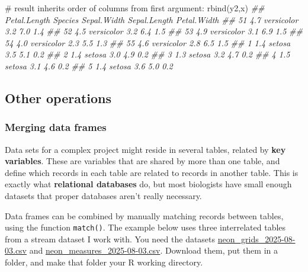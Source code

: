 \documentclass[
  13,
  letterpaper,
]{report}
\newenvironment{Shaded}{\begin{snugshade}}{\end{snugshade}}
\newcommand{\CommentTok}[1]{\textcolor[rgb]{0.37,0.37,0.37}{#1}}
\newcommand{\DocumentationTok}[1]{\textcolor[rgb]{0.37,0.37,0.37}{\textit{#1}}}
\newcommand{\FunctionTok}[1]{\textcolor[rgb]{0.28,0.35,0.67}{#1}}
\newcommand{\NormalTok}[1]{\textcolor[rgb]{0.00,0.23,0.31}{#1}}
\begin{document}
\begin{Shaded}
\begin{Highlighting}[]
\CommentTok{\# result inherits order of columns from first argument:}
\FunctionTok{rbind}\NormalTok{(y2,x)}
\DocumentationTok{\#\#    Petal.Length    Species Sepal.Width Sepal.Length Petal.Width}
\DocumentationTok{\#\# 51          4.7 versicolor         3.2          7.0         1.4}
\DocumentationTok{\#\# 52          4.5 versicolor         3.2          6.4         1.5}
\DocumentationTok{\#\# 53          4.9 versicolor         3.1          6.9         1.5}
\DocumentationTok{\#\# 54          4.0 versicolor         2.3          5.5         1.3}
\DocumentationTok{\#\# 55          4.6 versicolor         2.8          6.5         1.5}
\DocumentationTok{\#\# 1           1.4     setosa         3.5          5.1         0.2}
\DocumentationTok{\#\# 2           1.4     setosa         3.0          4.9         0.2}
\DocumentationTok{\#\# 3           1.3     setosa         3.2          4.7         0.2}
\DocumentationTok{\#\# 4           1.5     setosa         3.1          4.6         0.2}
\DocumentationTok{\#\# 5           1.4     setosa         3.6          5.0         0.2}
\end{Highlighting}
\end{Shaded}

\subsection{Other operations}\label{sec-05-df-oth}

\subsubsection{Merging data frames}\label{sec-05-df-oth-merg}

Data sets for a complex project might reside in several tables, related
by \textbf{key variables}. These are variables that are shared by more
than one table, and define which records in each table are related to
records in another table. This is exactly what \textbf{relational
databases} do, but most biologists have small enough datasets that
proper databases aren't really necessary.

Data frames can be combined by manually matching records between tables,
using the function \texttt{match()}. The example below uses three
interrelated tables from a stream dataset I work with. You need the
datasets
\href{https://greenquanteco.github.io/neon_grids_2025-08-03.csv}{neon\_grids\_2025-08-03.csv}
and
\href{https://greenquanteco.github.io/neon_measures_2025-08-03.csv}{neon\_measures\_2025-08-03.csv}.
Download them, put them in a folder, and make that folder your R working
directory.
\end{document}
